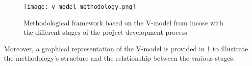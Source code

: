 \begin{figure}
  \texttt{[image: v\_model\_methodology.png]}
  \caption{Methodological framework based on the V-model from \gls{incose} with the different stages of the project development process\autocite{ruddle2020vmodel}}
  \label{fig:v_model_methodology}
\end{figure}


Moreover, a graphical representation of the V-model is provided in \cref{fig:v_model_methodology} to illustrate the methodology's structure and the relationship between the various stages.

